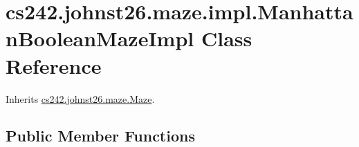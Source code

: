 \hypertarget{classcs242_1_1johnst26_1_1maze_1_1impl_1_1_manhattan_boolean_maze_impl}{\section{cs242.\-johnst26.\-maze.\-impl.\-Manhattan\-Boolean\-Maze\-Impl Class Reference}
\label{classcs242_1_1johnst26_1_1maze_1_1impl_1_1_manhattan_boolean_maze_impl}
}


Inherits \hyperlink{interfacecs242_1_1johnst26_1_1maze_1_1_maze}{cs242.\-johnst26.\-maze.\-Maze}.

\subsection*{Public Member Functions}
